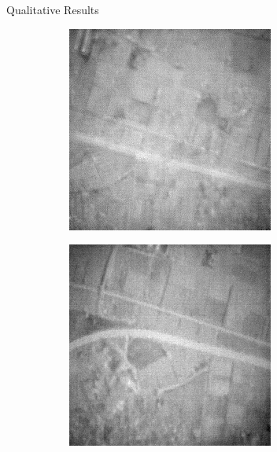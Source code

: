\documentclass[final]{beamer}
\newlength{\colwidth}
\begin{document}
\begin{frame}[t]
\begin{columns}[t]
\begin{column}{\colwidth}
\begin{block}{Qualitative Results}
\begin{figure}
\begin{subfigure}[b]{0.19\textwidth}
        \end{subfigure}
        \hfill
        \begin{subfigure}[b]{0.19\textwidth}
            \centering
            \includegraphics[width=\textwidth]{../figs/outputs/petit/71.png}
        \end{subfigure}
        \hfill
        \begin{subfigure}[b]{0.19\textwidth}
            \centering
            \includegraphics[width=\textwidth]{../figs/outputs/mono/605.png}
        \end{subfigure}      
        

\end{figure}
\end{block}
\end{column}
\end{columns}
\end{frame}
\end{document}
